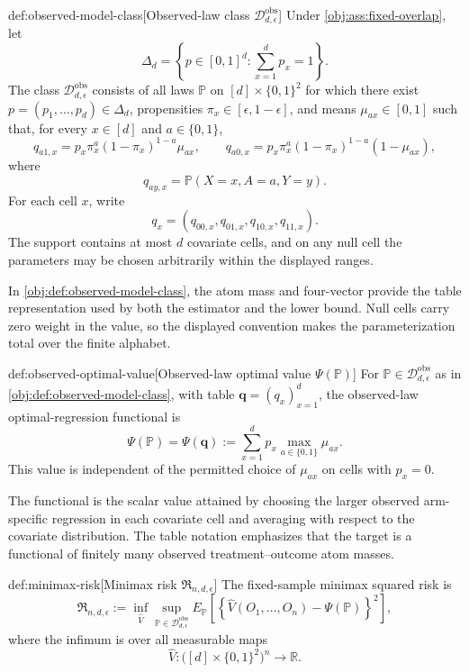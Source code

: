 \begin{definitionv}{def:observed-model-class}[Observed-law class \(\mathcal D_{d,\epsilon}^{\mathrm{obs}}\)]
Under \cref{obj:ass:fixed-overlap}, let
\[
\Delta_d=\left\{p\in[0,1]^d:\sum_{x=1}^d p_x=1\right\}.
\]
The class \(\mathcal D_{d,\epsilon}^{\mathrm{obs}}\) consists of all laws \(\mathbb P\) on \([d]\times\{0,1\}^2\) for which there exist \(p=(p_1,\ldots,p_d)\in\Delta_d\), propensities \(\pi_x\in[\epsilon,1-\epsilon]\), and means \(\mu_{ax}\in[0,1]\) such that, for every \(x\in[d]\) and \(a\in\{0,1\}\),
\[
q_{a1,x}
=
p_x\pi_x^a(1-\pi_x)^{1-a}\mu_{ax},
\qquad
q_{a0,x}
=
p_x\pi_x^a(1-\pi_x)^{1-a}(1-\mu_{ax}),
\]
where
\[
q_{ay,x}=\mathbb P(X=x,A=a,Y=y).
\]
For each cell \(x\), write
\[
q_x=(q_{00,x},q_{01,x},q_{10,x},q_{11,x}).
\]
The support contains at most \(d\) covariate cells, and on any null cell the parameters may be chosen arbitrarily within the displayed ranges.
\end{definitionv}

In \cref{obj:def:observed-model-class}, the atom mass  and four-vector  provide the table representation used by both the estimator and the lower bound. Null cells carry zero weight in the value, so the displayed convention makes the parameterization total over the finite alphabet.

\begin{definitionv}{def:observed-optimal-value}[Observed-law optimal value \(\Psi(\mathbb P)\)]
For \(\mathbb P\in\mathcal D_{d,\epsilon}^{\mathrm{obs}}\) as in \cref{obj:def:observed-model-class}, with table \(\mathbf q=(q_x)_{x=1}^d\), the observed-law optimal-regression functional is
\[
\Psi(\mathbb P)=\Psi(\mathbf q)
:=
\sum_{x=1}^d p_x\max_{a\in\{0,1\}}\mu_{ax}.
\]
This value is independent of the permitted choice of \(\mu_{ax}\) on cells with \(p_x=0\).
\end{definitionv}

The functional  is the scalar value attained by choosing the larger observed arm-specific regression in each covariate cell and averaging with respect to the covariate distribution. The table notation  emphasizes that the target is a functional of finitely many observed treatment--outcome atom masses.

\begin{definitionv}{def:minimax-risk}[Minimax risk \(\mathfrak R_{n,d,\epsilon}\)]
The fixed-sample minimax squared risk is
\[
\mathfrak R_{n,d,\epsilon}
:=
\inf_{\widehat V}
\sup_{\mathbb P\in\mathcal D_{d,\epsilon}^{\mathrm{obs}}}
E_{\mathbb P}
\left[
\left\{
\widehat V(O_1,\ldots,O_n)-\Psi(\mathbb P)
\right\}^2
\right],
\]
where the infimum is over all measurable maps
\[
\widehat V:\bigl([d]\times\{0,1\}^2\bigr)^n\to\mathbb R.
\]
\end{definitionv}

